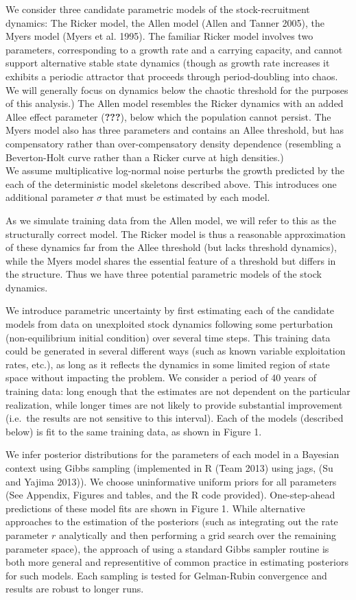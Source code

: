 \documentclass[author-year, review]{elsarticle} %
\begin{document}
We consider three candidate parametric models of the stock-recruitment
dynamics: The Ricker model, the Allen model (Allen and Tanner 2005), the
Myers model (Myers et al. 1995). The familiar Ricker model involves two
parameters, corresponding to a growth rate and a carrying capacity, and
cannot support alternative stable state dynamics (though as growth rate
increases it exhibits a periodic attractor that proceeds through
period-doubling into chaos. We will generally focus on dynamics below
the chaotic threshold for the purposes of this analysis.) The Allen
model resembles the Ricker dynamics with an added Allee effect parameter
({\textbf{???}}), below which the population cannot persist. The Myers
model also has three parameters and contains an Allee threshold, but has
compensatory rather than over-compensatory density dependence
(resembling a Beverton-Holt curve rather than a Ricker curve at high
densities.)\\We assume multiplicative log-normal noise perturbs the
growth predicted by the each of the deterministic model skeletons
described above. This introduces one additional parameter $\sigma$ that
must be estimated by each model.

As we simulate training data from the Allen model, we will refer to this
as the structurally correct model. The Ricker model is thus a reasonable
approximation of these dynamics far from the Allee threshold (but lacks
threshold dynamics), while the Myers model shares the essential feature
of a threshold but differs in the structure. Thus we have three
potential parametric models of the stock dynamics.

We introduce parametric uncertainty by first estimating each of the
candidate models from data on unexploited stock dynamics following some
perturbation (non-equilibrium initial condition) over several time
steps. This training data could be generated in several different ways
(such as known variable exploitation rates, etc.), as long as it
reflects the dynamics in some limited region of state space without
impacting the problem. We consider a period of 40 years of training
data: long enough that the estimates are not dependent on the particular
realization, while longer times are not likely to provide substantial
improvement (i.e.~the results are not sensitive to this interval). Each
of the models (described below) is fit to the same training data, as
shown in Figure 1.

We infer posterior distributions for the parameters of each model in a
Bayesian context using Gibbs sampling (implemented in R (Team 2013)
using jags, (Su and Yajima 2013)). We choose uninformative uniform
priors for all parameters (See Appendix, Figures and tables, and the R
code provided). One-step-ahead predictions of these model fits are shown
in Figure 1. While alternative approaches to the estimation of the
posteriors (such as integrating out the rate parameter $r$ analytically
and then performing a grid search over the remaining parameter space),
the approach of using a standard Gibbs sampler routine is both more
general and representitive of common practice in estimating posteriors
for such models. Each sampling is tested for Gelman-Rubin convergence
and results are robust to longer runs.
\end{document}
